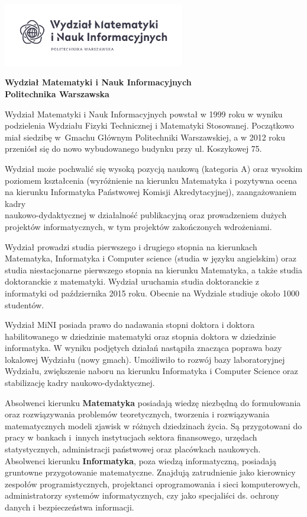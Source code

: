 \documentclass[\main/boa.tex]{subfiles}
\begin{document}
	\begin{minipage}[t]{0.915\textwidth}
		\center     
		\includegraphics[width=300px]{img/logos.bw/mini_nowe.png} 
	\end{minipage}

\begin{center}
\Large \textbf {Wydział Matematyki i Nauk Informacyjnych \\ Politechnika Warszawska}
\end{center}

\vskip 0.3cm
\normalsize 

Wydział Matematyki i Nauk Informacyjnych powstał w 1999 roku w wyniku podzielenia Wydziału Fizyki Technicznej i Matematyki Stosowanej. Początkowo miał siedzibę w~Gmachu Głównym Politechniki Warszawskiej, a w 2012 roku przeniósł się do nowo wybudowanego budynku przy ul. Koszykowej 75.

Wydział może pochwalić się wysoką pozycją naukową (kategoria A) oraz wysokim poziomem kształcenia (wyróżnienie na kierunku Matematyka i pozytywna ocena na kierunku Informatyka Państwowej Komisji Akredytacyjnej), zaangażowaniem kadry \\ naukowo-dydaktycznej w działalność publikacyjną oraz prowadzeniem dużych projektów informatycznych, w tym projektów zakończonych wdrożeniami.

Wydział prowadzi studia pierwszego i drugiego stopnia na kierunkach Matematyka, Informatyka i Computer science (studia w języku angielskim) oraz studia niestacjonarne pierwszego stopnia na kierunku Matematyka, a także studia doktoranckie z matematyki. Wydział uruchamia studia doktoranckie z informatyki od października 2015 roku. Obecnie na Wydziale studiuje około 1000 studentów.

Wydział MiNI posiada prawo do nadawania stopni doktora i doktora habilitowanego w dziedzinie matematyki oraz stopnia doktora w dziedzinie informatyka. W wyniku podjętych działań nastąpiła znacząca poprawa bazy lokalowej Wydziału (nowy gmach). Umożliwiło to rozwój bazy laboratoryjnej Wydziału, zwiększenie naboru na kierunku Informatyka i Computer Science oraz stabilizację kadry naukowo-dydaktycznej.

Absolwenci kierunku \textbf{Matematyka} posiadają wiedzę niezbędną do formułowania oraz rozwiązywania problemów teoretycznych, tworzenia i rozwiązywania matematycznych modeli zjawisk w różnych dziedzinach życia. Są przygotowani do pracy w bankach i~innych instytucjach sektora finansowego, urzędach statystycznych, administracji państwowej oraz placówkach naukowych. Absolwenci kierunku \textbf{Informatyka}, poza wiedzą informatyczną, posiadają gruntowne przygotowanie matematyczne. Znajdują zatrudnienie jako kierownicy zespołów programistycznych, projektanci oprogramowania i sieci komputerowych, administratorzy systemów informatycznych, czy jako specjaliści ds. ochrony danych i bezpieczeństwa informacji.
\end{document}
